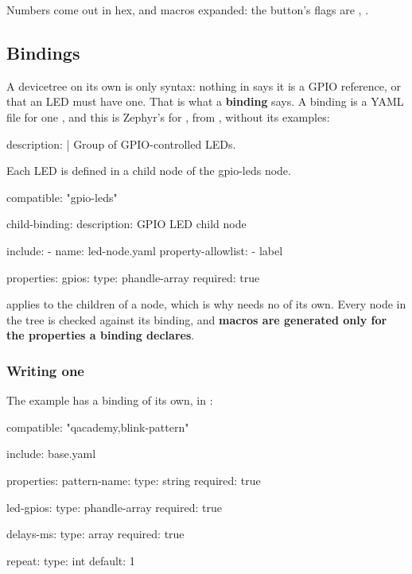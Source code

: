 Numbers come out in hex, and macros expanded: the button’s flags are , .

\subsection{Bindings}
A devicetree on its own is only syntax: nothing in  says it is a GPIO
reference, or that an LED must have one. That is what a \textbf{binding} says. A binding is a YAML
file for one , and this is Zephyr’s for , from
, without its examples:

\begin{yamlcode}
description: |
  Group of GPIO-controlled LEDs.

  Each LED is defined in a child node of the gpio-leds node.

compatible: "gpio-leds"

child-binding:
  description: GPIO LED child node

  include:
    - name: led-node.yaml
      property-allowlist:
        - label

  properties:
    gpios:
      type: phandle-array
      required: true
\end{yamlcode}

 applies to the children of a  node, which is why 
needs no  of its own. Every node in the tree is checked against its binding, and
\textbf{macros are generated only for the properties a binding declares}.

\subsubsection{Writing one}
The  example has a binding of its own, in
:

\begin{yamlcode}
compatible: "qacademy,blink-pattern"

include: base.yaml

properties:
  pattern-name:
    type: string
    required: true

  led-gpios:
    type: phandle-array
    required: true

  delays-ms:
    type: array
    required: true

  repeat:
    type: int
    default: 1
\end{yamlcode}

